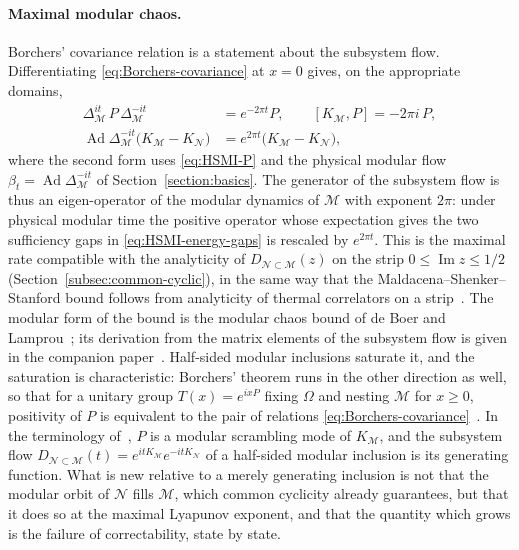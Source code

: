\documentclass[a4paper,11pt]{article}
\theoremstyle{definition}
\newcommand{\nn}{\nonumber}
\newcommand{\mN}{\mathcal{N}}
\newcommand{\mM}{\mathcal{M}}
\begin{document}
\paragraph{Maximal modular chaos.}
Borchers' covariance relation is a statement about the subsystem flow. Differentiating \eqref{eq:Borchers-covariance} at $x=0$ gives, on the appropriate domains,
\begin{align}
 \Delta_{\mM}^{it}\,P\,\Delta_{\mM}^{-it}&=e^{-2\pi t}P,\qquad [K_{\mM},P]=-2\pi i\,P,\nn\\
 \operatorname{Ad}\Delta_{\mM}^{-it}\bigl(K_{\mM}-K_{\mN}\bigr)&=e^{2\pi t}\bigl(K_{\mM}-K_{\mN}\bigr),
 \label{eq:modular-Lyapunov}
\end{align}
where the second form uses \eqref{eq:HSMI-P} and the physical modular flow $\beta_t=\operatorname{Ad}\Delta_{\mM}^{-it}$ of Section~\ref{section:basics}. The generator of the subsystem flow is thus an eigen-operator of the modular dynamics of $\mM$ with exponent $2\pi$: under physical modular time the positive operator whose expectation gives the two sufficiency gaps in \eqref{eq:HSMI-energy-gaps} is rescaled by $e^{2\pi t}$. This is the maximal rate compatible with the analyticity of $D_{\mN\subset\mM}(z)$ on the strip $0\le\operatorname{Im}z\le1/2$ (Section~\ref{subsec:common-cyclic}), in the same way that the Maldacena--Shenker--Stanford bound follows from analyticity of thermal correlators on a strip~\cite{MSS2016}. The modular form of the bound is the modular chaos bound of de Boer and Lamprou~\cite{deBoerLamprou2020}; its derivation from the matrix elements of the subsystem flow is given in the companion paper~\cite{companionQFT}. Half-sided modular inclusions saturate it, and the saturation is characteristic: Borchers' theorem runs in the other direction as well, so that for a unitary group $T(x)=e^{ixP}$ fixing $\Omega$ and nesting $\mM$ for $x\ge0$, positivity of $P$ is equivalent to the pair of relations \eqref{eq:Borchers-covariance}~\cite{revolutionizing}. In the terminology of~\cite{deBoerLamprou2020}, $P$ is a modular scrambling mode of $K_{\mM}$, and the subsystem flow $D_{\mN\subset\mM}(t)=e^{itK_{\mM}}e^{-itK_{\mN}}$ of a half-sided modular inclusion is its generating function. What is new relative to a merely generating inclusion is not that the modular orbit of $\mN$ fills $\mM$, which common cyclicity already guarantees, but that it does so at the maximal Lyapunov exponent, and that the quantity which grows is the failure of correctability, state by state.
\end{document}
